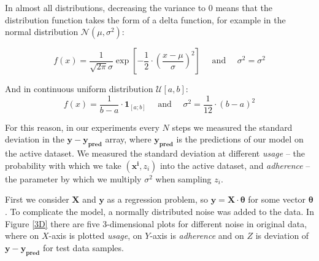 \documentclass{article}
\begin{document}
        In almost all distributions, decreasing the variance to 0 means that the distribution function takes the form of a delta function, for example in the normal distribution $\mathcal{N}(\mu, \sigma^2)$:

        \begin{equation*}
            f(x) = \dfrac{1}{\sqrt{2 \pi} \sigma} \exp\left[-\dfrac{1}{2} \cdot \left(\dfrac{x - \mu}{\sigma}\right)^2\right] \quad \text{ and } \quad \sigma^2 = \sigma^2
        \end{equation*}

        And in continuous uniform distribution $\mathcal{U}[a, b]$:
        \begin{equation*}
            f(x) = \dfrac{1}{b-a} \cdot \textbf{1}_{[a;b]} \quad \text{ and } \quad \sigma^2 = \dfrac{1}{12} \cdot (b-a)^2
        \end{equation*}

        For this reason, in our experiments every $N$ steps we measured the standard deviation in the $\mathbf{y} - \mathbf{y_{\text{pred}}}$ array, where $\mathbf{y_{\text{pred}}}$ is the predictions of our model on the active dataset. We measured the standard deviation at different \textit{usage} -- the probability with which we take $(\mathbf{x^i}, z_i)$ into the active dataset, and \textit{adherence} -- the parameter by which we multiply $\sigma^2$ when sampling $z_i$.
        
        First we consider $\mathbf{X}$ and $\mathbf{y}$ as a regression problem, so $\mathbf{y} = \mathbf{X}  \cdot \mathbf{\theta}$ for some vector $\mathbf{\theta}$. To complicate the model, a normally distributed noise was added to the data. In Figure \ref{3D} there are five 3-dimensional plots for different noise in original data, where on $X$-axis is plotted \textit{usage}, on $Y$-axis is \textit{adherence} and on $Z$ is deviation of $\mathbf{y} - \mathbf{y_{\text{pred}}}$ for test data samples.
\end{document}
